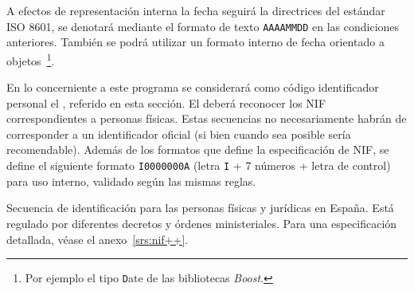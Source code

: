 \documentclass[11pt, a4paper, twoside, titlepage]{article}
\begin{document}
			A efectos de representación interna la fecha seguirá la directrices del estándar ISO 8601, se denotará mediante el formato de texto \verb|AAAAMMDD| en las condiciones anteriores. También se podrá utilizar un formato interno de fecha orientado a objetos~\footnote{Por ejemplo el tipo {\texttt Date} de las bibliotecas \textit{Boost}.}.

					En lo concerniente a este programa se considerará como código identificador personal el , referido en esta sección. El \software deberá reconocer los NIF correspondientes a personas físicas. Estas secuencias no necesariamente habrán de corresponder a un identificador oficial (si bien cuando sea posible sería recomendable). Además de los formatos que define la especificación de NIF, se define el siguiente formato \verb|I0000000A| (letra \verb|I| + 7 números + letra de control) para uso interno, validado según las mismas reglas. \label{srs:idpersonal}

				 \label{srs:nif}
					Secuencia de identificación para las personas físicas y jurídicas en España. Está regulado por diferentes decretos y órdenes ministeriales. Para una especificación detallada, véase el anexo~\ref{srs:nif++}.
\end{document}

